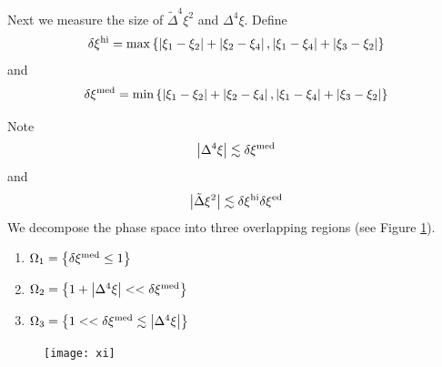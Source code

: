 \documentclass{article}
\begin{document}
Next we measure the size of $\tilde{\Delta}^{4}\xi^{2}$ and $\Delta^{4}\xi$. Define
\begin{equation*}
  \delta\xi^{\rm hi} = \max \left\{\left| \xi_{1}-\xi_{2} \right| + \left| \xi_{2}-\xi_{4} \right|, \left| \xi_{1}-\xi_{4} \right| + \left| \xi_{3}-\xi_{2} \right|\right\}
\end{equation*}
and
\begin{equation*}
  \delta\xi^{\rm med} = \min \left\{\left| \xi_{1}-\xi_{2} \right| + \left| \xi_{2}-\xi_{4} \right|, \left| \xi_{1}-\xi_{4} \right| + \left| \xi_{3}-\xi_{2} \right|\right\}
\end{equation*}

Note
\begin{equation*}
  \left| \Delta^{4}\xi  \right| 
  \lesssim \delta \xi^{\rm med}
\end{equation*}
and
\begin{equation*}
  \left| \tilde{\Delta}\xi^{2}  \right| 
  \lesssim \delta \xi^{\rm hi} \delta\xi^{\rm ed}
\end{equation*}
We decompose the phase space into three overlapping regions (see Figure \ref{fig:xi}).
\begin{enumerate}
  \item $\Omega_{1} = \left\{\delta\xi^{\rm med}\leq 1\right\}$
  \item $\Omega_{2} = \left\{1+ \left| \Delta^{4}\xi \right| << 
    \delta\xi^{\rm med}\right\}$
  \item $\Omega_{3} = \left\{1<< \delta\xi^{\rm med}\lesssim \left| \Delta^{4}\xi  \right|\right\}$ 
\end{enumerate}
\begin{figure}[h]
  \centering
  \texttt{[image: xi]}
  \label{fig:xi}
\end{figure}
\end{document}
